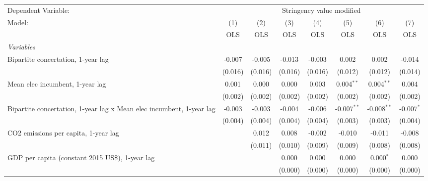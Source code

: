 
\begingroup
\centering
\begin{tabular}{lccccccc}
   \toprule
   Dependent Variable: & \multicolumn{7}{c}{Stringency value modified}\\
   Model:                                                               & (1)     & (2)     & (3)     & (4)     & (5)           & (6)           & (7)\\  
                                                                        &  OLS    & OLS     & OLS     & OLS     & OLS           & OLS           & OLS\\  
   \midrule
   \emph{Variables}\\
   Bipartite concertation, 1-year lag                                   & -0.007  & -0.005  & -0.013  & -0.003  & 0.002         & 0.002         & -0.014\\   
                                                                        & (0.016) & (0.016) & (0.016) & (0.016) & (0.012)       & (0.012)       & (0.014)\\   
   Mean elec incumbent, 1-year lag                                      & 0.001   & 0.000   & 0.000   & 0.003   & 0.004$^{**}$  & 0.004$^{**}$  & 0.004\\   
                                                                        & (0.002) & (0.002) & (0.002) & (0.002) & (0.002)       & (0.002)       & (0.002)\\   
   Bipartite concertation, 1-year lag x Mean elec incumbent, 1-year lag & -0.003  & -0.003  & -0.004  & -0.006  & -0.007$^{**}$ & -0.008$^{**}$ & -0.007$^{*}$\\   
                                                                        & (0.004) & (0.004) & (0.004) & (0.004) & (0.003)       & (0.003)       & (0.004)\\   
   CO2 emissions per capita, 1-year lag                                 &         & 0.012   & 0.008   & -0.002  & -0.010        & -0.011        & -0.008\\   
                                                                        &         & (0.011) & (0.010) & (0.009) & (0.009)       & (0.008)       & (0.008)\\   
   GDP per capita (constant 2015 US\$), 1-year lag                      &         &         & 0.000   & 0.000   & 0.000         & 0.000$^{*}$   & 0.000\\   
                                                                        &         &         & (0.000) & (0.000) & (0.000)       & (0.000)       & (0.000)\\   

\end{tabular}
